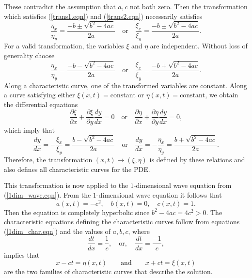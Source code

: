 \documentclass[12pt]{article}
\theoremstyle{definition}
\numberwithin{equation}{section}
\begin{document}
These contradict the assumption that $a,c$ not both zero. Then the transformation which satisfies (\ref{trans1.eqn}) and (\ref{trans2.eqn}) necessarily satisfies
$$\frac{\eta_x}{\eta_y}=\frac{-b\pm\sqrt{b^2-4ac}}{2a}\quad\mbox{or}\quad\frac{\xi_x}{\xi_y}=\frac{-b\pm\sqrt{b^2-4ac}}{2a}.$$ 
For a valid transformation, the variables $\xi$ and $\eta$ are independent. Without loss of generality choose
$$\frac{\eta_x}{\eta_y}=\frac{-b-\sqrt{b^2-4ac}}{2a}\quad\mbox{or}\quad\frac{\xi_x}{\xi_y}=\frac{-b+\sqrt{b^2-4ac}}{2a}.$$ Along a characteristic curve, one of the transformed variables are constant. Along a curve satisfying either $\xi(x,t)=\mbox{constant}$ or $\eta(x,t)=\mbox{constant}$, we obtain the differential equations
\begin{equation}
\frac{\partial\xi}{\partial x}+\frac{\partial\xi}{\partial y}\frac{dy}{dx}=0\quad\mbox{or}\quad\frac{\partial\eta}{\partial x}+\frac{\partial\eta}{\partial y}\frac{dy}{dx}=0,
\end{equation}
which imply that
\begin{equation}
\frac{dy}{dx}=-\frac{\xi_x}{\xi_y}=\frac{b-\sqrt{b^2-4ac}}{2a}\quad\mbox{or}\quad\frac{dy}{dx}=-\frac{\eta_x}{\eta_y}=\frac{b+\sqrt{b^2-4ac}}{2a}.
\label{1dim_char.eqn}
\end{equation}
Therefore, the transformation $(x,t)\mapsto(\xi,\eta)$ is defined by these relations and also defines all characteristic curves for the PDE.

This transformation is now applied to the $1$-dimensional wave equation from (\ref{1dim_wave.eqn}). From the $1$-dimensional wave equation it follows that $$a(x,t)=-c^2,\quad b(x,t)=0,\quad c(x,t)=1.$$ Then the equation is completely hyperbolic since $b^2-4ac=4c^2>0$. The characteristic equations defining the characteristic curves follow from  equations (\ref{1dim_char.eqn}) and the values of $a,b,c$, where
\begin{equation}
\frac{dt}{dx}=\frac{1}{c},\quad\mbox{or},\quad
\frac{dt}{dx}=\frac{-1}{c},
\end{equation}
implies that
\begin{equation}
x-ct=\eta(x,t)\qquad\mbox{and}\qquad x+ct=\xi(x,t)\label{1dim_trans.eqn}
\end{equation}
are the two families of characteristic curves that describe the solution. 
\end{document}
